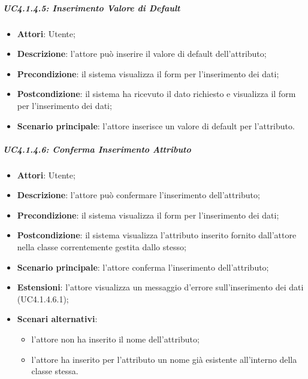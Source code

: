 \begin{itemize}
\begin{itemize}
\begin{itemize}
\begin{itemize}
\subparagraph{UC4.1.4.5: Inserimento Valore di Default}
\label{UC4.1.4.5}
\begin{itemize}
	\item \textbf{Attori}: Utente;
	\item \textbf{Descrizione}: l'attore può inserire il valore di default dell'attributo;
	\item \textbf{Precondizione}: il sistema visualizza il form per l'inserimento dei dati;
	\item \textbf{Postcondizione}: il sistema ha ricevuto il dato richiesto e visualizza il form per l'inserimento dei dati;
	\item \textbf{Scenario principale}: l'attore inserisce un valore di default per l'attributo.
\end{itemize}

\subparagraph{UC4.1.4.6: Conferma Inserimento Attributo}
\label{UC4.1.4.6}
\begin{itemize}
	\item \textbf{Attori}: Utente;
	\item \textbf{Descrizione}: l'attore può confermare l'inserimento dell'attributo;
	\item \textbf{Precondizione}: il sistema visualizza il form per l'inserimento dei dati;
	\item \textbf{Postcondizione}: il sistema visualizza l'attributo inserito fornito dall'attore nella classe correntemente gestita dallo stesso;
	\item \textbf{Scenario principale}: l'attore conferma l'inserimento dell'attributo;
	\item \textbf{Estensioni}: l'attore visualizza un messaggio d'errore sull'inserimento dei dati (UC4.1.4.6.1);
	\item \textbf{Scenari alternativi}:
	\begin{itemize}
		\item l'attore non ha inserito il nome dell'attributo;
		\item l'attore ha inserito per l'attributo un nome già esistente all'interno della classe stessa.
	\end{itemize}
\end{itemize}


\end{itemize}
\end{itemize}
\end{itemize}
\end{itemize}
